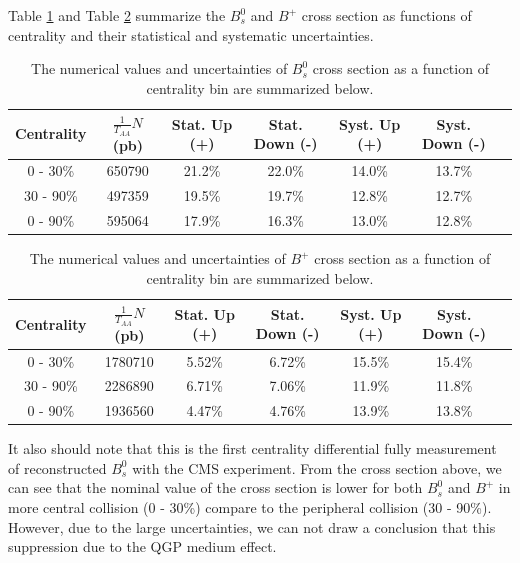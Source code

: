 Table \ref{BsXsectCent} and Table \ref{BPXsectCent} summarize the $B^0_s$ and $B^+$ cross section as functions of centrality and their statistical and systematic uncertainties.




\begin{table}[h]
\begin{center}
\caption{The numerical values and uncertainties of $B^0_s$ cross section as a function of centrality bin are summarized below.}
\vspace{1em}
\label{BsXsectCent}
  \begin{tabular}{| c | c |c | c| c| c| c|}
    \hline
Centrality &  $\frac{1}{T_{AA}} N$ (pb) & Stat. Up (+)   & Stat. Down (-)  &  Syst. Up (+)  &  Syst. Down (-) \\
    \hline
    \hline
0 - 30\% &   650790  &  21.2\% & 22.0\% & 14.0\% & 13.7\% \\ 
30 - 90\%  & 497359  & 19.5\%  & 19.7\%  & 12.8\% & 12.7\% \\ 
0 - 90\% &  595064 & 17.9\%   &  16.3\% & 13.0\% & 12.8\% \\ 
    \hline
    \hline
\end{tabular}
\end{center}
\end{table}


\begin{table}[h]
\begin{center}
\caption{The numerical values and uncertainties of $B^+$ cross section as a function of centrality bin are summarized below.}
\vspace{1em}
\label{BPXsectCent}
  \begin{tabular}{| c | c |c | c| c| c| c|}
    \hline
Centrality &  $\frac{1}{T_{AA}} N$ (pb) & Stat. Up (+)   & Stat. Down (-)  &  Syst. Up (+)  &  Syst. Down (-) \\
    \hline
    \hline
0 - 30\% &   1780710  &  5.52\% & 6.72\% & 15.5\% & 15.4\% \\ 
30 - 90\%  & 2286890  & 6.71\%  & 7.06\%  & 11.9\% & 11.8\% \\ 
0 - 90\% &  1936560 & 4.47\%   &  4.76\% & 13.9\% & 13.8\% \\ 
    \hline
    \hline
\end{tabular}
\end{center}
\end{table}



It also should note that this is the first centrality differential fully measurement of reconstructed $B^0_s$ with the CMS experiment. From the cross section above, we can see that the nominal value of the cross section is lower for both $B^0_s$ and $B^+$ in more central collision (0 - 30\%) compare to the peripheral collision (30 - 90\%). However, due to the large uncertainties, we can not draw a conclusion that this suppression due to the QGP medium effect.






